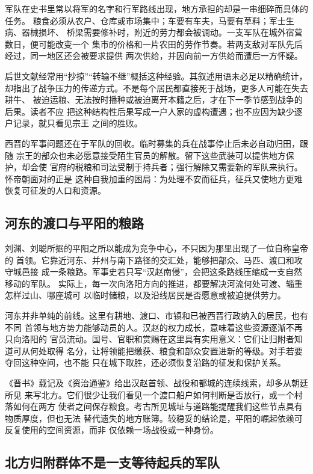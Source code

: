 军队在史书里常以将军的名字和行军路线出现，地方承担的却是一串细碎而具体的任务。
粮食必须从农户、仓库或市场集中；车要有车夫，马要有草料；军士生病、器械损坏、
桥梁需要修补时，附近的劳力都会被调动。一支军队在城外宿营数日，便可能改变一个
集市的价格和一片农田的劳作节奏。若两支敌对军队先后经过，同一地区还会被要求提供
两次供给，并因向前一方供给而遭后一方怀疑。

后世文献经常用“抄掠”“转输不继”概括这种经验。其叙述用语未必足以精确统计，
却指出了战争压力的传递方式。不是每个居民都直接死于战场，更多人可能在失去耕牛、
被迫运粮、无法按时播种或被迫离开本籍之后，才在下一季节感到战争的后果。读者不应
把这种结构性后果写成一户人家的虚构遭遇；也不应因为缺少逐户记录，就只看见宗王
之间的胜败。

西晋的军事问题还在于军队的回收。临时募集的兵在战事停止后未必自动归田，跟随
宗王的部众也未必愿意接受陌生官员的解散。留下这些武装可以提供地方保护，却会使
官府的税粮和司法受制于持兵者；强行解除又需要新的军队来执行。怀帝朝面对的正是
这种自我加重的困局：为处理不安而征兵，征兵又使地方更难恢复可征发的人口和资源。

\subsection{河东的渡口与平阳的粮路}

刘渊、刘聪所据的平阳之所以能成为竞争中心，不只因为那里出现了一位自称皇帝的
首领。它靠近河东、并州与南下路径的交汇处，能够把部众、马匹、渡口和攻守城邑接
成一条粮路。军事史若只写“汉赵南侵”，会把这条路线压缩成一支自然移动的军队。
实际上，每一次向洛阳方向的推进，都要解决河流何处可渡、辎重怎样过山、哪座城可
以临时储粮，以及沿线居民是否愿意或被迫提供劳力。

河东并非单纯的前线。这里有耕地、渡口、市镇和已被西晋行政纳入的居民，也有不同
首领与地方势力能够动员的人。汉赵的权力成长，意味着这些资源逐渐不再只向洛阳的
官员流动。国号、官职和赏赐在这里具有实用意义：它们让归附者知道可从何处取得
名分，让将领能把缴获、粮食和部众安置进新的等级。对手若要夺回这种空间，也不能
只在城下取胜，还必须恢复沿路的征发和保护关系。

《晋书》载记及《资治通鉴》给出汉赵首领、战役和都城的连续线索，却多从朝廷所见
来写北方。它们很少让我们看见一个渡口船户如何判断是否放行，或一个村落如何在两方
使者之间保存粮食。考古所见城址与道路能提醒我们这些节点具有物质厚度，但也无法
替代遗失的地方账簿。较稳妥的结论是，平阳的崛起依赖可反复使用的空间资源，而非
仅依赖一场战役或一种身份。

\subsection{北方归附群体不是一支等待起兵的军队}

